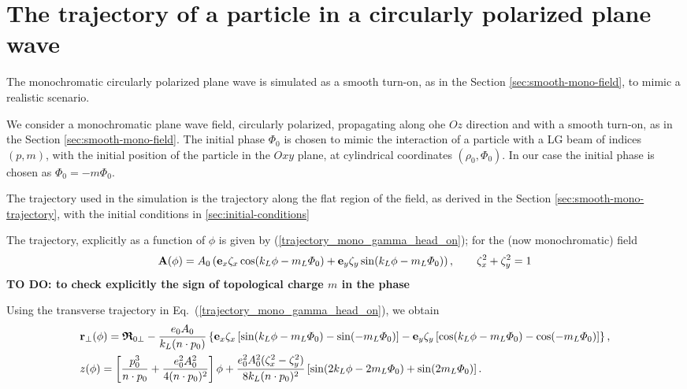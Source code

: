 \section{The trajectory of a particle in a circularly polarized plane wave}

The monochromatic circularly polarized plane wave is simulated as a smooth turn-on, as in the Section \ref{sec:smooth-mono-field}, to mimic a realistic scenario.

We consider a monochromatic plane  wave field, circularly polarized, propagating along ohe $Oz$ direction and with a smooth turn-on, as in the Section \ref{sec:smooth-mono-field}. The initial phase $\Phi_0$ is chosen to mimic the interaction of a particle with a LG beam of indices $(p,m)$, with the initial position of the particle in the $Oxy$ plane, at cylindrical coordinates $(\rho_0,\varPhi_0)$. In our case the initial phase is chosen as $\Phi_0=-m\varPhi_0$.

The trajectory used in the simulation is the trajectory along the flat region of the field, as derived in the Section \ref{sec:smooth-mono-trajectory}, with the initial conditions in \ref{sec:initial-conditions}

The trajectory, explicitly as a function of $\phi$ is given by (\ref{trajectory_mono_gamma_head_on}); for the (now monochromatic) field
\begin{align}
    {\bf A}(\phi)=A_0\left({\bf e}_x\zeta_x\cos(k_L\phi-m_L\varPhi_0)+{\bf e}_y\zeta_y\sin(k_L\phi-m_L\varPhi_0)\right), \qquad \zeta_x^2+\zeta_y^2=1
\end{align}
{\bf \color{orange} TO DO: to check explicitly the sign of topological charge $m$ in the phase}

Using the transverse trajectory in Eq.~(\ref{trajectory_mono_gamma_head_on}), we obtain
\begin{align}
     & {\bf r}_{\perp}(\phi)
    = {\boldsymbol{\mathfrak R}}_{0\perp}
    -\frac{e_0 A_0}{k_L(n\cdot p_0)}
    \left\{
    {\bf e}_x\zeta_x\left[\sin(k_L\phi-m_L\varPhi_0)-\sin(-m_L\varPhi_0)\right]
    -{\bf e}_y\zeta_y\left[\cos(k_L\phi-m_L\varPhi_0)-\cos(-m_L\varPhi_0)\right]
    \right\},\nonumber       \\
     & z(\phi)
    =\left[\frac{p_0^3}{n\cdot p_0}
        +\frac{e_0^2A_0^2}{4(n\cdot p_0)^2}\right]\phi
    +\frac{e_0^2A_0^2(\zeta_x^2-\zeta_y^2)}{8k_L(n\cdot p_0)^2}
    \left[\sin(2k_L\phi-2m_L\varPhi_0)+\sin(2m_L\varPhi_0)\right].
\end{align}

